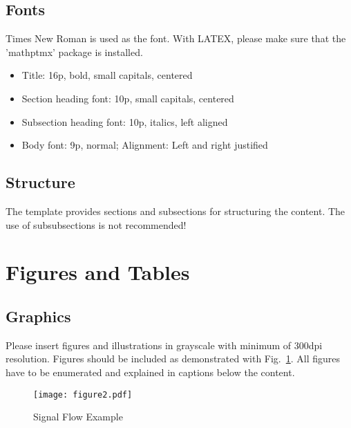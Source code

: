 \documentclass[a4paper, twocolumn]{article}
\begin{document}
\subsection{Fonts}

Times New Roman is used as the font.  
%
With LATEX, please make sure that the 'mathptmx'
package is installed.
 
\begin{itemize}
    \item Title: 16p, bold, small capitals, centered
    \item Section heading font: 10p, small capitals, centered 
    \item Subsection heading font: 10p, italics, left aligned
    \item Body font: 9p, normal; Alignment: Left and right justified
\end{itemize}
 
\subsection{Structure}

The template provides sections and subsections for structuring the content.
%
The use of subsubsections  is not recommended!



\section{Figures and Tables} \label{sec:Important}
 
\subsection{Graphics}

Please insert figures and illustrations in grayscale with minimum of
300dpi resolution.
%
Figures should be included as demonstrated with  Fig.~\ref{fig:fig2}.
%
All figures have to be enumerated and explained in captions below the content.

\begin{figure}[htb]
    \begin{center}
        \texttt{[image: figure2.pdf]}
    \end{center}
    \caption{Signal Flow Example \label{fig:fig2}}
\end{figure}
\end{document}
